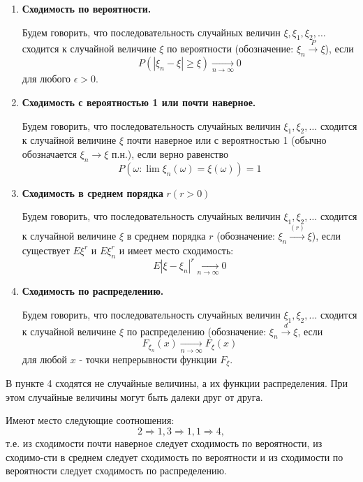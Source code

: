 \begin{enumerate}
	\item \textbf{Сходимость по вероятности.}
	
	Будем говорить, что последовательность случайных величин $\xi, \xi_1, \xi_2, \dots$ сходится к случайной величине $\xi$ по вероятности (обозначение: $\xi_n \overset{P}{\to} \xi$), если
	\[ P(|\xi_n - \xi| \ge \xi) \underset{n \to \infty}{\to} 0 \]
	для любого $\epsilon > 0$.
	
	\item \textbf{Сходимость с вероятностью 1 или почти наверное.}
	
	Будем говорить, что последовательность случайных величин $\xi_1, \xi_2, \dots$ сходится к случайной величине $\xi$ почти наверное или с вероятностью 1 (обычно обозначается $\xi_n \to \xi$ п.н.), если верно равенство
	\[ P(\omega : \lim \xi_n (\omega) = \xi (\omega)) = 1 \]
	
	\item \textbf{Сходимость в среднем порядка} $r(r > 0)$
	
	Будем говорить, что последовательность случайных величин $\xi_1, \xi_2, \dots$ сходится к случайной величине $\xi$ в среднем порядка $r$ (обозначение: $\xi_n \overset{(r)}{\to} \xi$), если существует $E\xi^r$ и $E\xi_n^r$ и имеет место сходимость:
	\[ E |\xi - \xi_n|^r \underset{n \to \infty}{\to} 0 \]
	
	\item \textbf{Сходимость по распределению.}
	
	Будем говорить, что последовательность случайных величин $\xi_1, \xi_2, \dots$ сходится к случайной величине $\xi$ по распределению (обозначение: $\xi_n \overset{d}{\to} \xi$, если
	\[ F_{\xi_n} (x) \underset{n \to \infty}{\to} F_{\xi} (x) \]
	для любой $x$ - точки непрерывности функции $F_{\xi}$.
\end{enumerate}
\begin{remark}
	В пункте 4 сходятся не случайные величины, а их функции распределения. При этом случайные величины могут быть далеки друг от друга.
\end{remark}

\begin{theorem}
	Имеют место следующие соотношения:
	\[ 2 \Rightarrow 1, 3 \Rightarrow 1, 1 \Rightarrow 4, \]
	т.е. из сходимости почти наверное следует сходимость по вероятности, из сходимо-сти в среднем следует сходимость по вероятности и из сходимости по вероятности следует сходимость по распределению.
\end{theorem}


